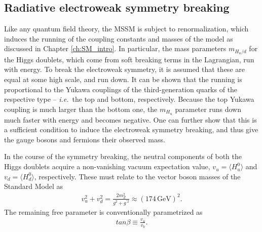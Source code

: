 \subsection{Radiative electroweak symmetry breaking}
Like any quantum field theory, the MSSM is subject to renormalization, which induces the running of the coupling constants and masses of the model as discussed in Chapter \ref{ch:SM_intro}. In particular, the mass parameters $m_{H_u/d}$ for the Higgs doublets, which come from soft breaking terms in the Lagrangian, run with energy. To break the electroweak symmetry, it is assumed that these are equal at some high scale, and run down. It can be shown that the running is proportional to the Yukawa couplings of the third-generation quarks of the respective type -- {\it i.e.}\ the top and bottom, respectively. Because the top Yukawa coupling is much larger than the bottom one, the $m_{H_u}$ parameter runs down much faster with energy and becomes negative. One can further show that this is a sufficient condition to induce the electroweak symmetry breaking, and thus give the gauge bosons and fermions their observed mass. 

In the course of the symmetry breaking, the neutral components of both the Higgs doublets acquire a non-vanishing vacuum expectation value, $v_u = \langle H_u^0 \rangle$ and $v_d = \langle H_d^0 \rangle$, respectively. These must relate to the vector boson masses of the Standard Model as
\begin{align}
	v_u^2 + v_d^2 = \frac{2m_Z^2}{g^2 + g^{'2}} \approx (174 \,\mathrm{GeV})^2.
\end{align}
The remaining free parameter is conventionally parametrized as
\begin{align}
	tan \beta \equiv \frac{v_u}{v_b}.
\end{align}


